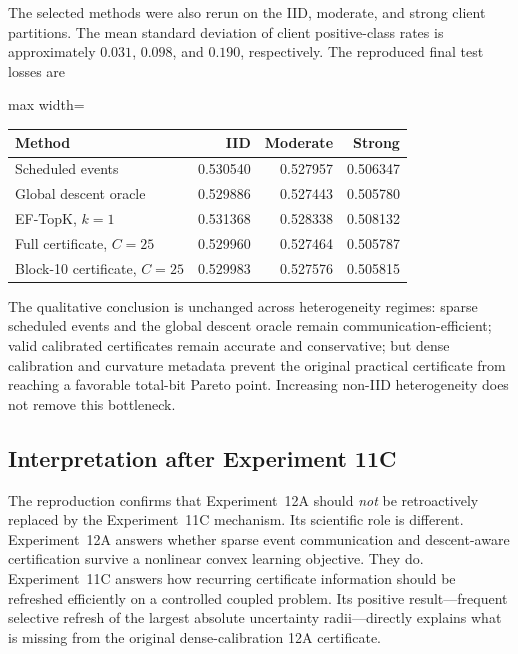 The selected methods were also rerun on the IID, moderate, and strong client partitions. The mean standard deviation of client positive-class rates is approximately $0.031$, $0.098$, and $0.190$, respectively. The reproduced final test losses are
\begin{center}
\begin{adjustbox}{max width=\textwidth}
\begin{tabular}{lrrr}
\toprule
Method & IID & Moderate & Strong\\
\midrule
Scheduled events & 0.530540 & 0.527957 & 0.506347\\
Global descent oracle & 0.529886 & 0.527443 & 0.505780\\
EF-TopK, $k=1$ & 0.531368 & 0.528338 & 0.508132\\
Full certificate, $C=25$ & 0.529960 & 0.527464 & 0.505787\\
Block-10 certificate, $C=25$ & 0.529983 & 0.527576 & 0.505815\\
\bottomrule
\end{tabular}
\end{adjustbox}
\end{center}
The qualitative conclusion is unchanged across heterogeneity regimes: sparse scheduled events and the global descent oracle remain communication-efficient; valid calibrated certificates remain accurate and conservative; but dense calibration and curvature metadata prevent the original practical certificate from reaching a favorable total-bit Pareto point. Increasing non-IID heterogeneity does not remove this bottleneck.

\subsection{Interpretation after Experiment 11C}

The reproduction confirms that Experiment~12A should \emph{not} be retroactively replaced by the Experiment~11C mechanism. Its scientific role is different. Experiment~12A answers whether sparse event communication and descent-aware certification survive a nonlinear convex learning objective. They do. Experiment~11C answers how recurring certificate information should be refreshed efficiently on a controlled coupled problem. Its positive result---frequent selective refresh of the largest absolute uncertainty radii---directly explains what is missing from the original dense-calibration 12A certificate.

